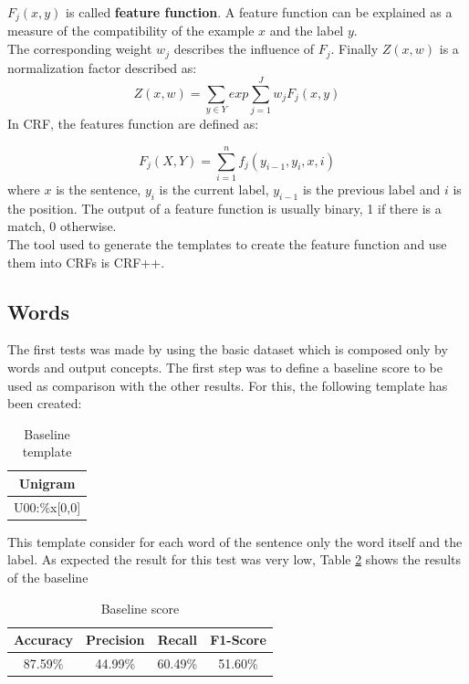 \documentclass[11pt,a4paper]{article}
\begin{document}
$F_{j}(x,y)$ is called \textbf{feature function}. A feature function can be explained as a measure of the compatibility of the example $x$ and the label $y$. \\
The corresponding weight $w_{j}$ describes the influence of $F_{j}$.
Finally $Z(x,w)$ is a normalization factor described as:
\begin{equation}
    Z(x,w) = \sum_{y \in Y} exp \sum_{j = 1}^{J} w_{j}F_{j}(x, y)
\end{equation}
In CRF, the features function are defined as:

\begin{equation}
    F_{j}(X,Y) = \sum_{i=1}^{n} f_{j}(y_{i-1}, y_{i}, x, i)
\end{equation}
where $x$ is the sentence, $y_{i}$ is the current label, $y_{i-1}$ is the previous label and $i$ is the position. The output of a feature function is usually binary, 1 if there is a match, 0 otherwise.\\
The tool used to generate the templates to create the feature function and use them into CRFs is CRF++.
\subsection{Words}
\label{words}
The first tests was made by using the basic dataset which is composed only by words and output concepts.
The first step was to define a baseline score to be used as comparison with the other results. For this, the following template has been created:
\begin{table}[H]
    \begin{center}
        \begin{tabular}{|c|}
            \hline \bf Unigram \\ \hline
            U00:\%x[0,0] \\
            \hline
        \end{tabular}
    \end{center}
    \caption{\label{t00} Baseline template}
\end{table}
This template consider for each word of the sentence only the word itself and the label. As expected the result for this test was very low, Table \ref{t1} shows the results of the baseline
\begin{table}[H]
    \begin{center}
        \begin{tabular}{|c|c|c|c|}
            \hline \bf Accuracy &   \bf Precision &  \bf Recall &  \bf F1-Score   \\ \hline
            87.59\% & 44.99\% & 60.49\% & 51.60\%\\
            \hline
        \end{tabular}
    \end{center}
    \caption{\label{t1} Baseline score}
\end{table}
\end{document}
